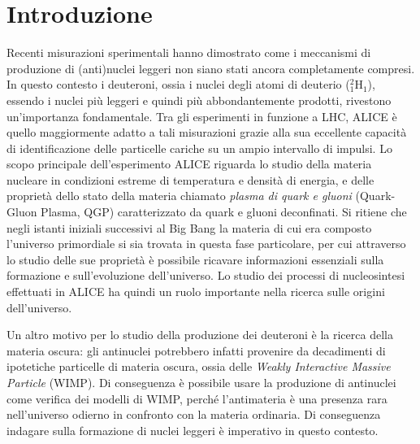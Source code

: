\chapter*{Introduzione}
Recenti misurazioni sperimentali hanno dimostrato come i meccanismi di produzione di (anti)nuclei leggeri non siano stati ancora completamente compresi.
In questo contesto i deuteroni, ossia i nuclei degli atomi di deuterio ($^2_1$H$_1$), essendo i nuclei più leggeri e quindi più abbondantemente prodotti, rivestono un’importanza fondamentale.
Tra gli esperimenti in funzione a LHC, ALICE è quello maggiormente adatto a tali misurazioni grazie alla sua eccellente capacità di identificazione delle particelle cariche su un ampio intervallo di impulsi.
Lo scopo principale dell'esperimento ALICE riguarda lo studio della materia nucleare in condizioni estreme di temperatura e densità di energia, e delle proprietà dello stato della materia chiamato \emph{plasma di quark e gluoni} (Quark-Gluon Plasma, QGP) caratterizzato da quark e gluoni deconfinati.
Si ritiene che negli istanti iniziali successivi al Big Bang la materia di cui era composto l’universo primordiale si sia trovata in questa fase particolare, per cui attraverso lo studio delle sue proprietà è possibile ricavare informazioni essenziali sulla formazione e sull'evoluzione dell'universo.
Lo studio dei processi di nucleosintesi effettuati in ALICE ha quindi un ruolo importante nella ricerca sulle origini dell'universo.

Un altro motivo per lo studio della produzione dei deuteroni è la ricerca della materia oscura: gli antinuclei potrebbero infatti provenire da decadimenti di ipotetiche particelle di materia oscura, ossia delle \emph{Weakly Interactive Massive Particle} (WIMP).
Di conseguenza è possibile usare la produzione di antinuclei come verifica dei modelli di WIMP, perché l'antimateria è una presenza rara nell'universo odierno in confronto con la materia ordinaria. 
Di conseguenza indagare sulla formazione di nuclei leggeri è imperativo in questo contesto.

